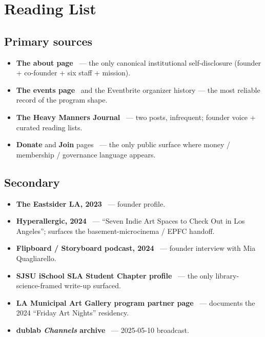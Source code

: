 \documentclass[10pt,letterpaper,twocolumn]{article}
\begin{document}
\section{Reading List}

\subsection{Primary sources}

\begin{itemize}
\item \textbf{The about page}~\citep{hmlsite} --- the only canonical institutional self-disclosure (founder + co-founder + six staff + mission).
\item \textbf{The events page}~\citep{hmlsite} and the Eventbrite organizer history --- the most reliable record of the program shape.
\item \textbf{The Heavy Manners Journal}~\citep{hmljournal} --- two posts, infrequent; founder voice + curated reading lists.
\item \textbf{Donate} and \textbf{Join} pages~\citep{hmldonate, hmljoin} --- the only public surface where money / membership / governance language appears.
\end{itemize}

\subsection{Secondary}

\begin{itemize}
\item \textbf{The Eastsider LA, 2023}~\citep{eastsider2023} --- founder profile.
\item \textbf{Hyperallergic, 2024}~\citep{hyperallergic2024indie} --- ``Seven Indie Art Spaces to Check Out in Los Angeles''; surfaces the basement-microcinema / EPFC handoff.
\item \textbf{Flipboard / Storyboard podcast, 2024}~\citep{flipboardpodcast} --- founder interview with Mia Quagliarello.
\item \textbf{SJSU iSchool SLA Student Chapter profile}~\citep{sjsuischool} --- the only library-science-framed write-up surfaced.
\item \textbf{LA Municipal Art Gallery program partner page}~\citep{lamag2024} --- documents the 2024 ``Friday Art Nights'' residency.
\item \textbf{dublab \emph{Channels} archive}~\citep{dublabchannels2025} --- 2025-05-10 broadcast.
\end{itemize}
\end{document}
